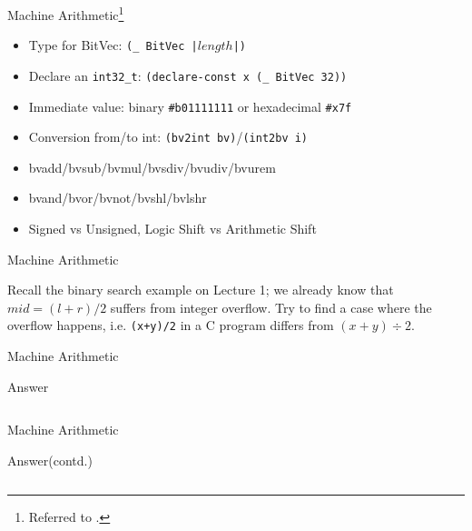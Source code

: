 \documentclass[10pt]{beamer}
\begin{document}
\begin{frame}[fragile]{Machine Arithmetic\footnote{Referred to \cite{bjorner2018programming}.}}
  \begin{itemize}[<+->]
    \item Type for BitVec: \texttt{(_ BitVec |$length$|)}
    \item Declare an \texttt{int32_t}: \texttt{(declare-const x (_ BitVec 32))}
    \item Immediate value: binary \texttt{#b01111111} or hexadecimal \texttt{#x7f}
    \item Conversion from/to int: \texttt{(bv2int bv)}/\texttt{(int2bv i)}
    \item bvadd/bvsub/bvmul/bvsdiv/bvudiv/bvurem
    \item bvand/bvor/bvnot/bvshl/bvlshr
    \item Signed vs Unsigned, Logic Shift vs Arithmetic Shift
  \end{itemize}
\end{frame}

\begin{frame}[fragile]{Machine Arithmetic}
  \begin{example}
    \vspace{4pt}
    Recall the binary search example on Lecture 1;
    we already know that $mid = (l + r) / 2$ suffers from integer overflow.
    Try to find a case where the overflow happens, i.e. \texttt{(x+y)/2}
    in a C program differs from $(x + y) \div 2$.
  \end{example}
\end{frame}

\begin{frame}[fragile]{Machine Arithmetic}
  \begin{alertblock}{Answer}
    \inputminted[mathescape=true]{lisp}{./src/ex6.smt2}
  \end{alertblock}
\end{frame}

\begin{frame}[fragile]{Machine Arithmetic}
  \begin{alertblock}{Answer(contd.)}
    \inputminted[mathescape=true]{lisp}{./src/ex6-out.smt2}
  \end{alertblock}
\end{frame}
\end{document}
